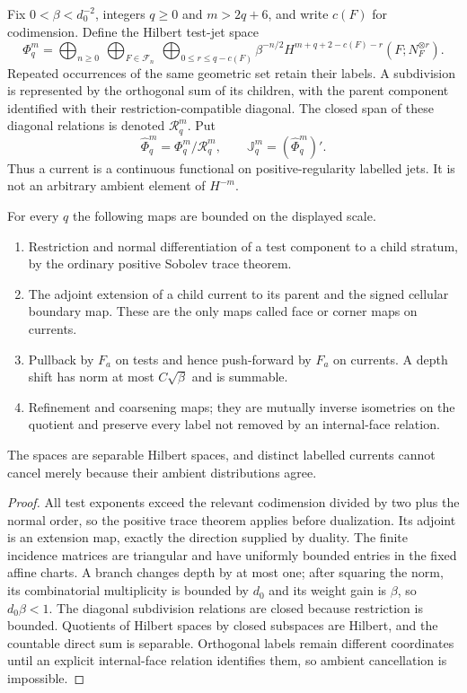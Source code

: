 Fix $0<\beta<d_0^{-2}$, integers $q\ge0$ and
$m>2q+6$, and write $c(F)$ for codimension.  Define the Hilbert test-jet space
\[
 \Phi_q^m=
 \bigoplus_{n\ge0}\ \bigoplus_{F\in\mathscr F_n}
 \ \bigoplus_{0\le r\le q-c(F)}
 \beta^{-n/2}H^{m+q+2-c(F)-r}
     (F;N_F^{\otimes r}).
\]
Repeated occurrences of the same geometric set retain their labels.  A
subdivision is represented by the orthogonal sum of its children, with the
parent component identified with their restriction-compatible diagonal.  The
closed span of these diagonal relations is denoted $\mathcal R_q^m$.  Put
\[
 \widehat\Phi_q^m=\Phi_q^m/\mathcal R_q^m,
 \qquad
 \mathbb J_q^m=(\widehat\Phi_q^m)' .
\]
Thus a current is a continuous functional on positive-regularity labelled
jets.  It is not an arbitrary ambient element of $H^{-m}$.

\begin{theorem}
\label{thm:r21-a1-incidence}
For every $q$ the following maps are bounded on the displayed scale.
\begin{enumerate}[label=(\roman*)]
\item Restriction and normal differentiation of a test component to a child
      stratum, by the ordinary positive Sobolev trace theorem.
\item The adjoint extension of a child current to its parent and the signed
      cellular boundary map.  These are the only maps called face or corner
      maps on currents.
\item Pullback by $F_a$ on tests and hence push-forward by $F_a$ on currents.
      A depth shift has norm at most $C\sqrt\beta$ and is summable.
\item Refinement and coarsening maps; they are mutually inverse isometries on
      the quotient and preserve every label not removed by an internal-face
      relation.
\end{enumerate}
The spaces are separable Hilbert spaces, and distinct labelled currents cannot
cancel merely because their ambient distributions agree.
\end{theorem}

\begin{proof}
All test exponents exceed the relevant codimension divided by two plus the
normal order, so the positive trace theorem applies before dualization.  Its
adjoint is an extension map, exactly the direction supplied by duality.  The
finite incidence matrices are triangular and have uniformly bounded entries
in the fixed affine charts.  A branch changes depth by at most one; after
squaring the norm, its combinatorial multiplicity is bounded by $d_0$ and its
weight gain is $\beta$, so $d_0\beta<1$.  The diagonal subdivision relations
are closed because restriction is bounded.  Quotients of Hilbert spaces by
closed subspaces are Hilbert, and the countable direct sum is separable.
Orthogonal labels remain different coordinates until an explicit
internal-face relation identifies them, so ambient cancellation is impossible.
\end{proof}

